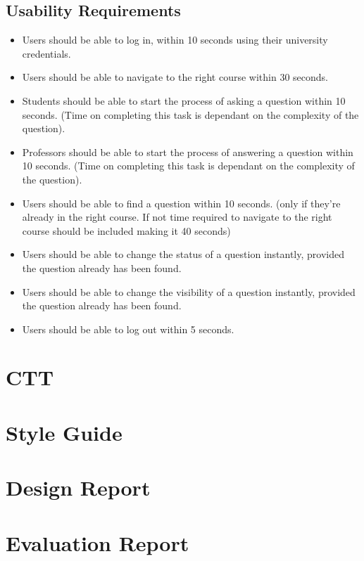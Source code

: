 \documentclass[10pt]{report}
\begin{document}
\subsection{Usability Requirements}
\begin{itemize}
	\item Users should be able to log in, within 10 seconds using their university credentials.
	\item Users should be able to navigate to the right course within 30 seconds.
	\item Students should be able to start the process of asking a question within 10 seconds. (Time on completing this task is dependant on the complexity of the question).
	\item Professors should be able to start the process of answering a question within 10 seconds. (Time on completing this task is dependant on the complexity of the question).
	\item Users should be able to find a question within 10 seconds. (only if they're already in the right course. If not time required to navigate to the right course should be included making it 40 seconds)
	\item Users should be able to change the status of a question instantly, provided the question already has been found.
	\item Users should be able to change the visibility of a question instantly, provided the question already has been found.
	\item Users should be able to log out within 5 seconds.
\end{itemize}

\section{CTT}

\section{Style Guide}


\section{Design Report}

\section{Evaluation Report}

\end{document}
